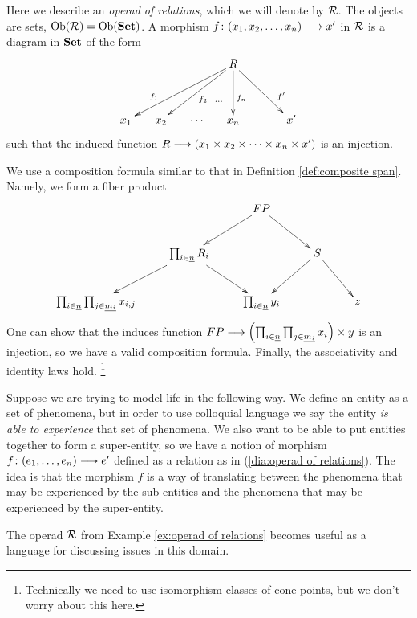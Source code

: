 
\subsubsection{}


\begin{example}\label{ex:operad of relations}

Here we describe an {\em operad of relations}, which we will denote by $\mathcal{R}$. The objects are sets, $\textnormal{Ob}(\mathcal{R})=\textnormal{Ob}({\bf Set})$. A morphism $f\colon (x_1,x_2,\ldots,x_n)\longrightarrow x'$ in $\mathcal{R}$ is a diagram in ${\bf Set}$ of the form 
\begin{align}\label{dia:operad of relations}
\xymatrix@=15pt{&&&R\ar[llldd]_(.7){f_1}\ar[lldd]^{f_2}\ar@{}[ldd]^(.6)\cdots\ar[dd]^(.6){f_n}\ar[rrdd]^(.7){f'}\\\\x_1&x_2&\cdots&x_n&&x'}
\end{align} 
such that the induced function $R\longrightarrow(x_1\times x_2\times\cdots\times x_n\times x')$ is an injection.

We use a composition formula similar to that in Definition \ref{def:composite span}. Namely, we form a fiber product
$$\xymatrix{&&FP\ar[rd]\ar[ld]\\&\prod_{i\in\ul{n}}R_i\ar[ld]\ar[rd]&&S\ar[ld]\ar[rd]\\\prod_{i\in\ul{n}}\prod_{j\in\ul{m_i}}x_{i,j}&&\prod_{i\in\ul{n}}y_i&&z}$$
One can show that the induces function $FP\longrightarrow\left(\prod_{i\in\underline{n}}\prod_{j\in\underline{m_i}}x_i\right)\times y$ is an injection, so we have a valid composition formula. Finally, the associativity and identity laws hold.
\footnote{Technically we need to use isomorphism classes of cone points, but we don't worry about this here.}

\end{example}

\begin{application}\label{app:entity by experience}
Suppose we are trying to model \href{http://en.wikipedia.org/wiki/Life}{\text life} in the following way. We define an entity as a set of phenomena, but in order to use colloquial language we say the entity {\em is able to experience} that set of phenomena. We also want to be able to put entities together to form a super-entity, so we have a notion of morphism $f\colon(e_1,\ldots,e_n)\longrightarrow e'$ defined as a relation as in (\ref{dia:operad of relations}). The idea is that the morphism $f$ is a way of translating between the phenomena that may be experienced by the sub-entities and the phenomena that may be experienced by the super-entity. 

The operad $\mathcal{R}$ from Example \ref{ex:operad of relations} becomes useful as a language for discussing issues in this domain.
\end{application}

